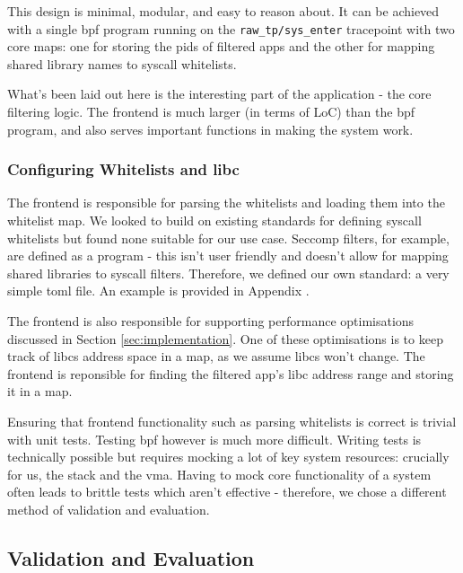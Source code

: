 This design is minimal, modular, and easy to reason about. It can be achieved
with a single \ac{bpf} program running on the \texttt{raw\_tp/sys\_enter}
tracepoint with two core maps: one for storing the \acp{pid} of filtered apps
and the other for mapping shared library names to syscall whitelists.

What's been laid out here is the interesting part of the application
- the core filtering logic. The frontend is much larger (in terms of LoC) than
the \ac{bpf} program, and also serves important functions in making the system
work.

\subsubsection{Configuring Whitelists and \ac{libc}}

The frontend is responsible for parsing the \af whitelists and loading them into
the whitelist map. We looked to build on existing standards for defining
syscall whitelists but found none suitable for our use case. Seccomp filters,
for example, are defined as a  program - this isn't user friendly and
doesn't allow for mapping shared libraries to syscall filters. Therefore, we defined our
own standard: a very simple \ac{toml} file. An example is provided in Appendix
.

The frontend is also responsible for supporting performance optimisations
discussed in Section \ref{sec:implementation}. One of these optimisations is
to keep track of \acp{libc} address space in a map, as we assume \acp{libc} won't
change. The frontend is reponsible for finding the filtered app's \ac{libc}
address range and storing it in a map.

Ensuring that frontend functionality such as parsing whitelists is correct is
trivial with unit tests. Testing \ac{bpf} however is much more difficult.
Writing tests is technically possible but requires mocking a lot of key system
resources: crucially for us, the stack and the \ac{vma}. Having to mock core
functionality of a system often leads to brittle tests which aren't effective -
therefore, we chose a different method of validation and evaluation.

\subsection{Validation and Evaluation}


